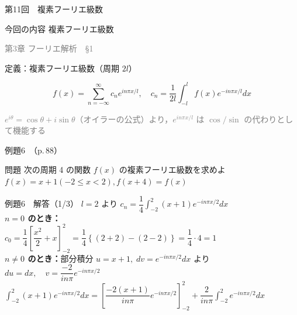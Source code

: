 \documentclass[professionalfonts]{beamer}
\begin{document}
\begin{frame}{第11回　複素フーリエ級数}
  \begin{block}{今回の内容}
  複素フーリエ級数
  \end{block}
  \vfill\hfill{\scriptsize \textcolor{gray}{第3章 フーリエ解析　§1}}
\end{frame}

\begin{frame}{定義：複素フーリエ級数（周期 $2l$）}
  \begin{block}{}
  \[
    f(x) = \sum_{n=-\infty}^{\infty} c_{n} e^{in\pi x/l}, \quad
    c_{n} = \frac{1}{2l} \int_{-l}^{l} f(x) e^{-in\pi x/l} dx
  \]
  \end{block}
  {\footnotesize\textcolor{gray}{$e^{i\theta}=\cos\theta+i\sin\theta$（オイラーの公式）より，$e^{in\pi x/l}$ は $\cos/\sin$ の代わりとして機能する}}
\end{frame}

\begin{frame}{例題6　（p.\,88）}
  \begin{exampleblock}{問題}
    次の周期 4 の関数 $f(x)$ の複素フーリエ級数を求めよ\\[2pt]
    $f(x) = x + 1  (-2 \leq x < 2),  f(x+4) = f(x)$\\[2pt]
  \end{exampleblock}
\end{frame}

\begin{frame}{例題6　解答（1/3）}
  $l=2$ より $c_{n} = \dfrac{1}{4}\displaystyle\int_{-2}^{2}(x+1)e^{-in\pi x/2}dx$\\[6pt]
  \textbf{$n=0$ のとき：}\\[4pt]
  $c_{0} = \dfrac{1}{4}\!\left[\dfrac{x^{2}}{2}+x\right]_{-2}^{2}
    = \dfrac{1}{4}\!\left\{(2+2)-(2-2)\right\} = \dfrac{1}{4}\cdot 4 = 1$\\[6pt]
  \textbf{$n\neq 0$ のとき：}部分積分 $u=x+1,\;dv=e^{-in\pi x/2}dx$ より\\[2pt]
  \hspace{2em}$du=dx,\quad v = \dfrac{-2}{in\pi}e^{-in\pi x/2}$\\[4pt]
  $\displaystyle\int_{-2}^{2}(x+1)e^{-in\pi x/2}dx
    = \!\left[\dfrac{-2(x+1)}{in\pi}e^{-in\pi x/2}\right]_{-2}^{2}
    + \dfrac{2}{in\pi}\int_{-2}^{2}e^{-in\pi x/2}dx$
\end{frame}
\end{document}

